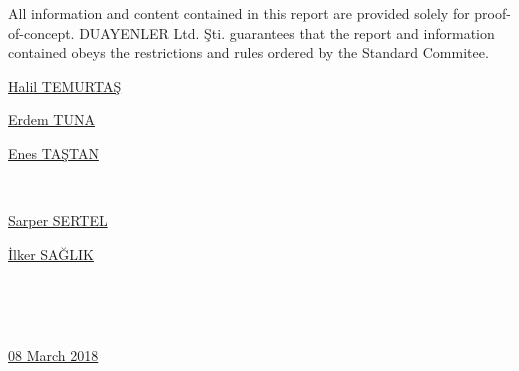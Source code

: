 \documentclass[a4paper,12pt]{article}
\begin{document}
		\textsf{ All information and content contained in this report are provided solely for proof-of-concept. DUAYENLER Ltd. Şti. guarantees that the report and information contained obeys the restrictions and rules ordered by the Standard Commitee.}
		
		\vspace{1cm}
		
		
		\begin{minipage}[b]{0.33\linewidth}
			\centering
			\underline{Halil TEMURTAŞ}
		\end{minipage}%
		\begin{minipage}[b]{0.33\linewidth}
			\centering
			\underline{Erdem TUNA}
		\end{minipage}%
		\begin{minipage}[b]{0.33\linewidth}
			\centering
			\underline{Enes TAŞTAN}
		\end{minipage} \\[2.5cm]
		
		\begin{minipage}[b]{0.495\linewidth}
			\centering
			\underline{Sarper SERTEL}
		\end{minipage}%
		\begin{minipage}[b]{0.495\linewidth}
			\centering
			\underline{İlker SAĞLIK}
		\end{minipage}\\[2.5cm]
		
		\begin{minipage}[b]{0.745\linewidth}
			\centering
			~~
		\end{minipage}%
		\begin{minipage}[b]{0.25\linewidth}
			\centering
			\underline{08 March 2018}
		\end{minipage}

\newpage

\begin{appendices}
	
%		
%		

	
\end{appendices}




	
	
	
\end{document}

